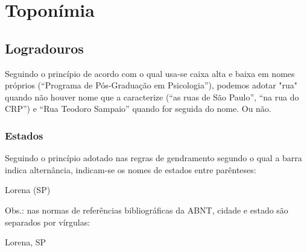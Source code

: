 \section{Toponímia}

\subsection{Logradouros}

Seguindo o princípio de acordo com o qual usa-se caixa alta e baixa em nomes próprios (``Programa de Pós-Graduação em Psicologia''), podemos adotar "rua" quando não houver nome que a caracterize (``as ruas de São Paulo'', ``na rua do CRP'') e ``Rua Teodoro Sampaio'' quando for seguida do nome. Ou não.

\subsubsection{Estados}

Seguindo o princípio adotado nas regras de gendramento segundo o qual a barra indica alternância, indicam-se os nomes de estados entre parênteses:

Lorena (SP)

Obs.: nas normas de referências bibliográficas da ABNT, cidade e estado são separados por vírgulas:

Lorena, SP



